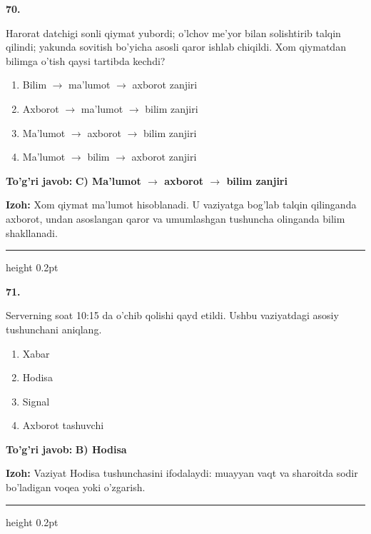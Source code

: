 \documentclass[10pt,a4paper,oneside]{article}
\begin{document}
\noindent\textbf{\color{ink}70.}
\par
Harorat datchigi sonli qiymat yubordi; o'lchov me'yor bilan solishtirib talqin qilindi; yakunda sovitish bo'yicha asosli qaror ishlab chiqildi. Xom qiymatdan bilimga o'tish qaysi tartibda kechdi?
\begin{enumerate}[label=\Alph*),leftmargin=9mm]
\item Bilim \ensuremath{\to} ma'lumot \ensuremath{\to} axborot zanjiri
\item Axborot \ensuremath{\to} ma'lumot \ensuremath{\to} bilim zanjiri
\item Ma'lumot \ensuremath{\to} axborot \ensuremath{\to} bilim zanjiri
\item Ma'lumot \ensuremath{\to} bilim \ensuremath{\to} axborot zanjiri
\end{enumerate}
\begin{tcolorbox}[enhanced,breakable,colback=teal!4,colframe=teal!50!black,boxrule=0.5pt,arc=1.1mm,left=3mm,right=3mm,top=1.7mm,bottom=1.7mm,before skip=2mm,after skip=2mm]
\textbf{\color{teal}To'g'ri javob:} \textbf{C) Ma'lumot \ensuremath{\to} axborot \ensuremath{\to} bilim zanjiri}
\par\smallskip
\textbf{Izoh:} Xom qiymat ma'lumot hisoblanadi. U vaziyatga bog'lab talqin qilinganda axborot, undan asoslangan qaror va umumlashgan tushuncha olinganda bilim shakllanadi.
\end{tcolorbox}
\vspace{2mm}\hrule height 0.2pt \vspace{3mm}

\noindent\textbf{\color{ink}71.}
\par
Serverning soat 10:15 da o'chib qolishi qayd etildi. Ushbu vaziyatdagi asosiy tushunchani aniqlang.
\begin{enumerate}[label=\Alph*),leftmargin=9mm]
\item Xabar
\item Hodisa
\item Signal
\item Axborot tashuvchi
\end{enumerate}
\begin{tcolorbox}[enhanced,breakable,colback=teal!4,colframe=teal!50!black,boxrule=0.5pt,arc=1.1mm,left=3mm,right=3mm,top=1.7mm,bottom=1.7mm,before skip=2mm,after skip=2mm]
\textbf{\color{teal}To'g'ri javob:} \textbf{B) Hodisa}
\par\smallskip
\textbf{Izoh:} Vaziyat Hodisa tushunchasini ifodalaydi: muayyan vaqt va sharoitda sodir bo'ladigan voqea yoki o'zgarish.
\end{tcolorbox}
\vspace{2mm}\hrule height 0.2pt \vspace{3mm}
\end{document}
